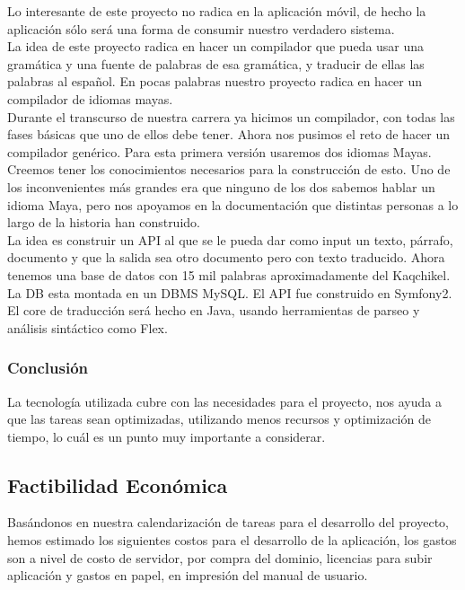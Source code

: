 \documentclass[a4paper,openright,11pt]{article}
\begin{document}
Lo interesante de este proyecto no radica en la aplicaci\'on m\'ovil, de hecho la aplicaci\'on s\'olo ser\'a una forma de consumir nuestro verdadero sistema.\\

La idea de este proyecto radica en hacer un compilador que pueda usar una gram\'atica y una fuente de palabras de esa gram\'atica, y traducir de ellas las palabras al español. En pocas palabras nuestro proyecto radica en hacer un compilador de idiomas mayas.\\

Durante el transcurso de nuestra carrera ya hicimos un compilador, con todas las fases b\'asicas que uno de ellos debe tener. Ahora nos pusimos el reto de hacer un compilador gen\'erico. Para esta primera versi\'on usaremos dos idiomas Mayas.\\

Creemos tener los conocimientos necesarios para la construcci\'on de esto. Uno de los inconvenientes m\'as grandes era que ninguno de los dos sabemos hablar un idioma Maya, pero nos apoyamos en la documentaci\'on que distintas personas a lo largo de la historia han construido.\\ 

La idea es construir un API al que se le pueda dar como input un texto, p\'arrafo, documento y que la salida sea otro documento pero con texto traducido. Ahora tenemos una base de datos con 15 mil palabras aproximadamente del Kaqchikel. La DB esta montada en un DBMS MySQL. El API fue construido en Symfony2.\\

El core de traducci\'on ser\'a hecho en Java,  usando herramientas de parseo y an\'alisis sint\'actico como Flex.

\subsubsection{Conclusión}
La tecnología utilizada cubre con las necesidades para el proyecto, nos ayuda a que las tareas sean optimizadas, utilizando menos recursos y optimización de tiempo, lo cuál es un punto muy importante a considerar.

\subsection{Factibilidad Econ\'omica}
Bas\'andonos en nuestra calendarizaci\'on de tareas para el desarrollo del proyecto, hemos estimado los siguientes costos para el desarrollo de la aplicaci\'on, los gastos son a nivel de costo de servidor, por compra del dominio, licencias para subir aplicaci\'on y gastos en papel, en impresi\'on del manual de usuario.\\
\end{document}

